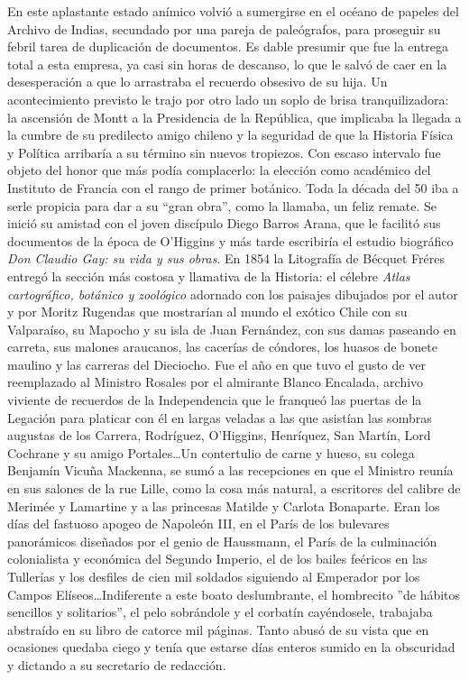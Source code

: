 \documentclass[10pt,twoside,openright]{memoir}
\begin{document}
En este aplastante estado anímico volvió a sumergirse en el océano de
papeles del Archivo de Indias, secundado por una pareja de paleógrafos,
para proseguir su febril tarea de duplicación de documentos. Es dable
presumir que fue la entrega total a esta empresa, ya casi sin horas de
descanso, lo que le salvó de caer en la desesperación a que lo
arrastraba el recuerdo obsesivo de su hija. Un acontecimiento previsto
le trajo por otro lado un soplo de brisa tranquilizadora: la ascensión
de Montt a la Presidencia de la República, que implicaba la llegada a la
cumbre de su predilecto amigo chileno y la seguridad de que la Historia
Física y Política arribaría a su término sin nuevos tropiezos. Con
escaso intervalo fue objeto del honor que más podía complacerlo: la
elección como académico del Instituto de Francia con el rango de primer
botánico. Toda la década del 50 iba a serle propicia para dar a su ``gran
obra'', como la llamaba, un feliz remate. Se inició su amistad con el
joven discípulo Diego Barros Arana, que le facilitó sus documentos de la
época de O'Higgins y más tarde escribiría el estudio biográfico
\emph{Don Claudio Gay: su vida y sus obras}. En 1854 la Litografía de
Bécquet Fréres entregó la sección más costosa y llamativa de la
Historia: el célebre \emph{Atlas cartográfico, botánico y zoológico}
adornado con los paisajes dibujados por el autor y por Moritz Rugendas
que mostrarían al mundo el exótico Chile con su Valparaíso, su Mapocho y
su isla de Juan Fernández, con sus damas paseando en carreta, sus
malones araucanos, las cacerías de cóndores, los huasos de bonete
maulino y las carreras del Dieciocho. Fue el año en que tuvo el gusto de
ver reemplazado al Ministro Rosales por el almirante Blanco Encalada,
archivo viviente de recuerdos de la Independencia que le franqueó las
puertas de la Legación para platicar con él en largas veladas a las que
asistían las sombras augustas de los Carrera, Rodríguez, O'Higgins,
Henríquez, San Martín, Lord Cochrane y su amigo Portales\ldots Un
contertulio de carne y hueso, su colega Benjamín Vicuña Mackenna, se
sumó a las recepciones en que el Ministro reunía en sus salones de la
rue Lille, como la cosa más natural, a escritores del calibre de Merimée
y Lamartine y a las princesas Matilde y Carlota Bonaparte. Eran los días
del fastuoso apogeo de Napoleón III, en el París de los bulevares
panorámicos diseñados por el genio de Haussmann, el París de la
culminación colonialista y económica del Segundo Imperio, el de los
bailes feéricos en las Tullerías y los desfiles de cien mil soldados
siguiendo al Emperador por los Campos Elíseos\ldots Indiferente a este
boato deslumbrante, el hombrecito ''de hábitos sencillos y solitarios'',
el pelo sobrándole y el corbatín cayéndosele, trabajaba abstraído en su
libro de catorce mil páginas. Tanto abusó de su vista que en ocasiones
quedaba ciego y tenía que estarse días enteros sumido en la obscuridad y
dictando a su secretario de redacción.
\end{document}
